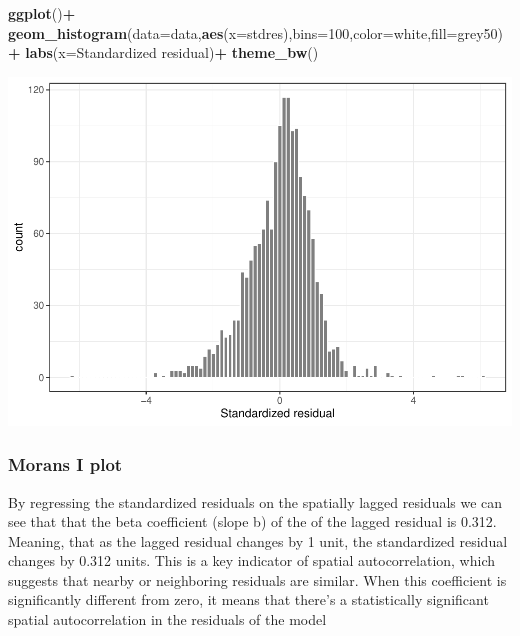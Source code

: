 \documentclass[
]{article}
\newenvironment{Shaded}{\begin{snugshade}}{\end{snugshade}}
\newcommand{\AttributeTok}[1]{\textcolor[rgb]{0.13,0.29,0.53}{#1}}
\newcommand{\DecValTok}[1]{\textcolor[rgb]{0.00,0.00,0.81}{#1}}
\newcommand{\FunctionTok}[1]{\textcolor[rgb]{0.13,0.29,0.53}{\textbf{#1}}}
\newcommand{\NormalTok}[1]{#1}
\newcommand{\SpecialCharTok}[1]{\textcolor[rgb]{0.81,0.36,0.00}{\textbf{#1}}}
\newcommand{\StringTok}[1]{\textcolor[rgb]{0.31,0.60,0.02}{#1}}
\begin{document}
\begin{Shaded}
\begin{Highlighting}[]
\FunctionTok{ggplot}\NormalTok{()}\SpecialCharTok{+}
  \FunctionTok{geom\_histogram}\NormalTok{(}\AttributeTok{data=}\NormalTok{data,}\FunctionTok{aes}\NormalTok{(}\AttributeTok{x=}\NormalTok{stdres),}\AttributeTok{bins=}\DecValTok{100}\NormalTok{,}\AttributeTok{color=}\StringTok{\textquotesingle{}white\textquotesingle{}}\NormalTok{,}\AttributeTok{fill=}\StringTok{\textquotesingle{}grey50\textquotesingle{}}\NormalTok{)}\SpecialCharTok{+}
  \FunctionTok{labs}\NormalTok{(}\AttributeTok{x=}\StringTok{\textquotesingle{}Standardized residual\textquotesingle{}}\NormalTok{)}\SpecialCharTok{+}
  \FunctionTok{theme\_bw}\NormalTok{()}
\end{Highlighting}
\end{Shaded}

\includegraphics{HW2-SpatialRegression_files/figure-latex/histogram-1.pdf}

\hypertarget{morans-i-plot}{%
\subsubsection{Morans I plot}\label{morans-i-plot}}

By regressing the standardized residuals on the spatially lagged
residuals we can see that that the beta coefficient (slope b) of the of
the lagged residual is 0.312. Meaning, that as the lagged residual
changes by 1 unit, the standardized residual changes by 0.312 units.
This is a key indicator of spatial autocorrelation, which suggests that
nearby or neighboring residuals are similar. When this coefficient is
significantly different from zero, it means that there's a statistically
significant spatial autocorrelation in the residuals of the model
\end{document}
